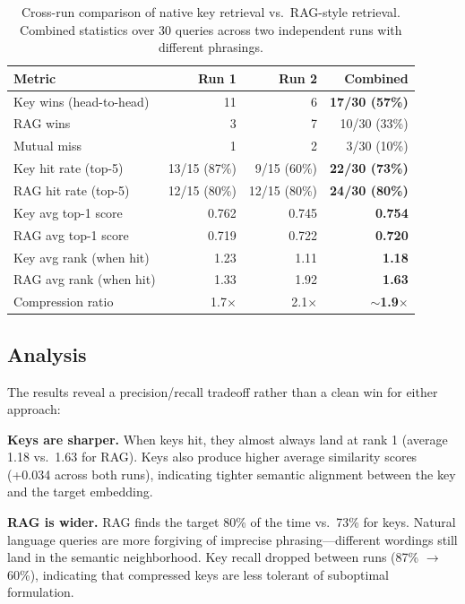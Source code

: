 \documentclass{article}
\begin{document}
\begin{table}[H]
\centering
\begin{tabular}{lrrr}
\toprule
\textbf{Metric} & \textbf{Run 1} & \textbf{Run 2} & \textbf{Combined} \\
\midrule
Key wins (head-to-head) & 11 & 6 & \textbf{17/30 (57\%)} \\
RAG wins & 3 & 7 & 10/30 (33\%) \\
Mutual miss & 1 & 2 & 3/30 (10\%) \\
\midrule
Key hit rate (top-5) & 13/15 (87\%) & 9/15 (60\%) & \textbf{22/30 (73\%)} \\
RAG hit rate (top-5) & 12/15 (80\%) & 12/15 (80\%) & \textbf{24/30 (80\%)} \\
\midrule
Key avg top-1 score & 0.762 & 0.745 & \textbf{0.754} \\
RAG avg top-1 score & 0.719 & 0.722 & \textbf{0.720} \\
\midrule
Key avg rank (when hit) & 1.23 & 1.11 & \textbf{1.18} \\
RAG avg rank (when hit) & 1.33 & 1.92 & \textbf{1.63} \\
\midrule
Compression ratio & 1.7$\times$ & 2.1$\times$ & \textbf{$\sim$1.9$\times$} \\
\bottomrule
\end{tabular}
\caption{Cross-run comparison of native key retrieval vs.\ RAG-style retrieval. Combined statistics over 30 queries across two independent runs with different phrasings.}
\label{tab:combined}
\end{table}

\subsection{Analysis}

The results reveal a precision/recall tradeoff rather than a clean win for either approach:

\textbf{Keys are sharper.} When keys hit, they almost always land at rank 1 (average 1.18 vs.\ 1.63 for RAG). Keys also produce higher average similarity scores (+0.034 across both runs), indicating tighter semantic alignment between the key and the target embedding.

\textbf{RAG is wider.} RAG finds the target 80\% of the time vs.\ 73\% for keys. Natural language queries are more forgiving of imprecise phrasing---different wordings still land in the semantic neighborhood. Key recall dropped between runs (87\% $\rightarrow$ 60\%), indicating that compressed keys are less tolerant of suboptimal formulation.
\end{document}
